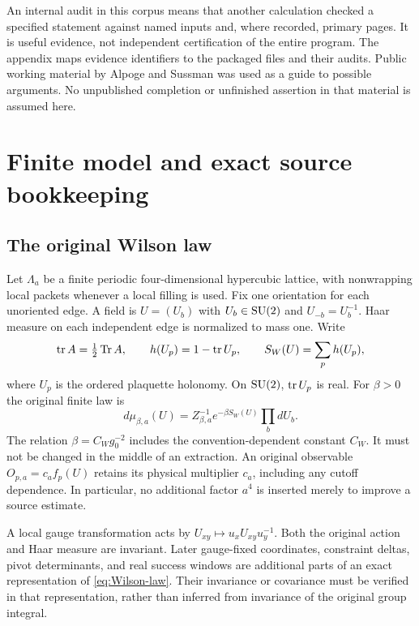 An internal audit in this corpus means that another calculation checked a specified statement against named inputs and, where recorded, primary pages. It is useful evidence, not independent certification of the entire program. The appendix maps evidence identifiers to the packaged files and their audits. Public working material by Alpoge and Sussman was used as a guide to possible arguments. No unpublished completion or unfinished assertion in that material is assumed here.

\section{Finite model and exact source bookkeeping}
\label{sec:finite-law}

\subsection{The original Wilson law}

Let $\Lambda_a$ be a finite periodic four-dimensional hypercubic lattice, with nonwrapping local packets whenever a local filling is used. Fix one orientation for each unoriented edge. A field is $U=(U_b)$ with $U_b\in\mathrm{SU}(2)$ and $U_{-b}=U_b^{-1}$. Haar measure on each independent edge is normalized to mass one. Write
\[
 \operatorname{tr} A=\tfrac12\operatorname{Tr} A,\qquad
 h(U_p)=1-\operatorname{tr} U_p,\qquad
 S_W(U)=\sum_p h(U_p),
\]
where $U_p$ is the ordered plaquette holonomy. On $\mathrm{SU}(2)$, $\operatorname{tr} U_p$ is real. For $\beta>0$ the original finite law is
\begin{equation}\label{eq:Wilson-law}
 d\mu_{\beta,a}(U)=Z_{\beta,a}^{-1}e^{-\beta S_W(U)}\prod_b dU_b.
\end{equation}
The relation $\beta=C_Wg_0^{-2}$ includes the convention-dependent constant $C_W$. It must not be changed in the middle of an extraction. An original observable $O_{p,a}=c_a f_p(U)$ retains its physical multiplier $c_a$, including any cutoff dependence. In particular, no additional factor $a^4$ is inserted merely to improve a source estimate.

A local gauge transformation acts by $U_{xy}\mapsto u_xU_{xy}u_y^{-1}$. Both the original action and Haar measure are invariant. Later gauge-fixed coordinates, constraint deltas, pivot determinants, and real success windows are additional parts of an exact representation of \eqref{eq:Wilson-law}. Their invariance or covariance must be verified in that representation, rather than inferred from invariance of the original group integral.

